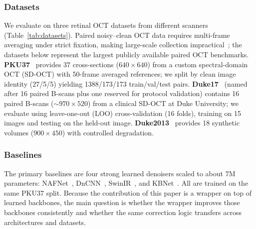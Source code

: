 \documentclass{ieeetj}
\begin{document}
\subsubsection{Datasets}
\label{sec:datasets}

We evaluate on three retinal OCT datasets from different scanners (Table~\ref{tab:datasets}). Paired noisy--clean OCT data requires multi-frame averaging under strict fixation, making large-scale collection impractical~\cite{geng2022triplet}; the datasets below represent the largest publicly available paired OCT benchmarks. \textbf{PKU37}~\cite{geng2022triplet} provides 37 cross-sections ($640{\times}640$) from a custom spectral-domain OCT (SD-OCT) with 50-frame averaged references; we split by clean image identity (27/5/5) yielding 1388/173/173 train/val/test pairs. \textbf{Duke17}~\cite{fang2012sparsity} (named after 16 paired B-scans plus one reserved for protocol validation) contains 16 paired B-scans (${\sim}970{\times}520$) from a clinical SD-OCT at Duke University; we evaluate using leave-one-out (LOO) cross-validation (16 folds), training on 15 images and testing on the held-out image. \textbf{Duke2013}~\cite{fang2013fast} provides 18 synthetic volumes ($900{\times}450$) with controlled degradation.

\begin{table}[t]
\centering
\caption{Datasets. PKU37 is the in-distribution (ID) domain; Duke17 is the primary cross-dataset benchmark with LOO evaluation.}
\label{tab:datasets}
\end{table}

\subsubsection{Baselines}

The primary baselines are four strong learned denoisers scaled to about 7M parameters: NAFNet~\cite{chen2022simple}, DnCNN~\cite{zhang2017beyond}, SwinIR~\cite{liang2021swinir}, and KBNet~\cite{zhang2023kbnet}. All are trained on the same PKU37 split. Because the contribution of this paper is a wrapper on top of learned backbones, the main question is whether the wrapper improves those backbones consistently and whether the same correction logic transfers across architectures and datasets.
\end{document}
